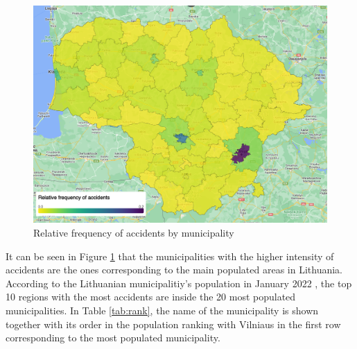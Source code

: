 \begin{figure}[H] 
\centering
\captionsetup{justification=centering}
\includegraphics[width=\textwidth]{Images/AccidentsMap.png}
\caption[Relative frequency of accidents by municipality]{Relative frequency of accidents by municipality}
\label{fig:accident_map}
\end{figure}

It can be seen in Figure \ref{fig:accident_map} that the municipalities with the higher intensity of accidents are the ones corresponding to the main populated areas in Lithuania.
According to the Lithuanian municipalitiy's population in January 2022 \cite{population}, the top 10 regions with the most accidents are inside the 20 most populated municipalities. In Table \ref{tab:rank}, the name of the municipality is shown together with its order in the population ranking with Vilniaus in the first row corresponding to the most populated municipality.

